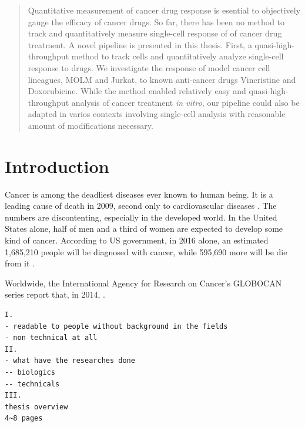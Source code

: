 \documentclass[pdftex,12pt,a4paper]{report}
\begin{document}

\begin{abstract}
Quantitative measurement of cancer drug response is esential to objectively gauge the efficacy of cancer drugs. So far, there has been no method to track and  quantitatively measure single-cell response of of cancer drug treatment. A novel pipeline is presented in this thesis. First, a quasi-high-throughput method to track cells and quantitatively analyze single-cell response to drugs. We investigate the response of model cancer cell lineagues, MOLM and Jurkat, to known anti-cancer drugs Vincristine and Doxorubicine. While the method enabled relatively easy and quasi-high-throughput analysis of cancer treatment \textit{in vitro}, our pipeline could also be adapted in varios contexts involving single-cell analysis with reasonable amount of modifications necessary.
\end{abstract}

\newpage

\tableofcontents

\newpage

\listoffigures

\newpage

\listoftables

\newpage

\chapter{Introduction}
\label{chapter:introduction}

Cancer is among the deadliest diseases ever known to human being. It is a leading cause of death in 2009, second only to cardiovascular diseases \cite{sudhakar2009history}. The numbers are discontenting, especially in the developed world. In the United States alone, half of men and a third of women are expected to develop some kind of cancer. According to US government, in 2016 alone, an estimated 1,685,210 people will be diagnosed with cancer, while 595,690 more will be die from it \cite{cancergov2017stat}.

Worldwide, the International Agency for Research on Cancer's GLOBOCAN series report that, in 2014, \cite{ferlay2015cancer}.

\begin{verbatim}
I.
- readable to people without background in the fields
- non technical at all
II.
- what have the researches done
-- biologics
-- technicals
III.
thesis overview
4~8 pages
\end{verbatim}
\end{document}
